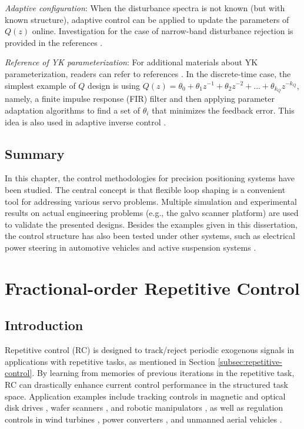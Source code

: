 \documentclass [11pt, proquest] {uwthesis}[2020/02/24]
\begin{document}
\emph{Adaptive configuration}: When the disturbance spectra is not
known (but with known structure), adaptive control can be applied
to update the parameters of $Q(z)$ online. Investigation for the
case of narrow-band disturbance rejection is provided in the references
\cite{XuChen_TCST2012,chen2010unknown}.

\emph{Reference of YK parameterization}: For additional materials
about YK parameterization, readers can refer to references \cite{landau2005adaptive,doyle2013feedback,ANDERSON19981485}.
In the discrete-time case, the simplest example of $Q$ design is
using $Q(z)=\theta_{0}+\theta_{1}z^{-1}+\theta_{2}z^{-2}+...+\theta_{k_{Q}}z^{-k_{Q}}$,
namely, a finite impulse response (FIR) filter and then applying parameter
adaptation algorithms to find a set of $\theta_{i}$ that minimizes
the feedback error. This idea is also used in adaptive inverse control
\cite{Widrow2007}.

\section{Summary}

\label{sec:conclu}In this chapter, the control methodologies for precision
positioning systems have been studied. The central concept is that
flexible loop shaping is a convenient tool for addressing various
servo problems. Multiple simulation and experimental results on actual
engineering problems (e.g., the galvo scanner platform) are used to validate the presented designs. Besides
the examples given in this dissertation, the control structure has also
been tested under other systems, such as electrical power steering
in automotive vehicles \cite{chen2013inverse} and active suspension
systems \cite{chen2013selective,landau2005adaptive}. 


\chapter{Fractional-order Repetitive Control} \label{chap:Fractional-RC}

\section{Introduction} \label{sec:Fractional-RC-Introduction}

Repetitive control (RC) \cite{inoue1981highpower} is designed to
track/reject periodic exogenous signals in applications with repetitive
tasks, as mentioned in Section \ref{subsec:repetitive-control}. By learning from memories of previous iterations in the repetitive
task, RC can drastically enhance current control performance in the
structured task space. Application examples include tracking controls
in magnetic and optical disk drives \cite{chew1989digital,doh2006design},
wafer scanners \cite{XuChen_TCST_RC2013}, and robotic manipulators
\cite{cosner1990plug,meng2017robust}, as well as regulation controls
in wind turbines \cite{navalkar2014subspace,castro2017variable},
power converters \cite{nazir2015analysis}, and unmanned aerial vehicles
\cite{he2017repetitive}.
\end{document}

